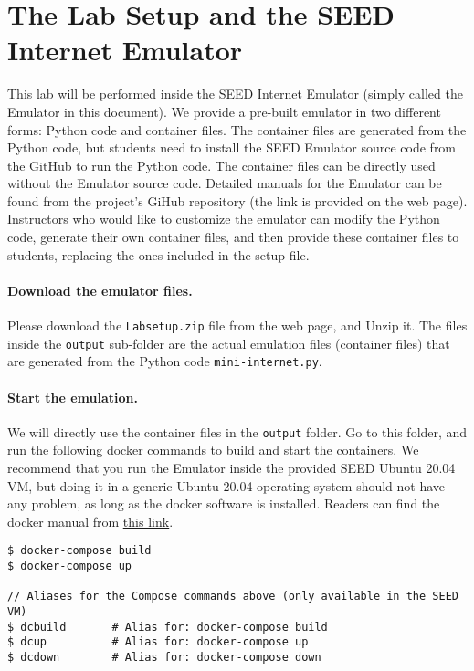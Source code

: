\section{The Lab Setup and the SEED Internet Emulator} 

This lab will be performed inside the SEED Internet Emulator (simply
called the Emulator in this document). 
We provide a pre-built emulator in two different forms: Python code
and container files. The container files are generated from
the Python code, but students need to install the SEED Emulator source 
code from the GitHub to run the Python code. The container files
can be directly used without the Emulator source code. 
Detailed manuals for the Emulator can be found from 
the project's GiHub repository (the link is provided on the web page).
Instructors who would like to customize the emulator can modify the Python
code, generate their own container files, and then provide these
container files to students, replacing the ones included in the 
setup file.


\paragraph{Download the emulator files.}
Please download the \texttt{Labsetup.zip} file from the web page, and 
Unzip it. The files inside the \texttt{output} sub-folder are the actual
emulation files (container files) that are
generated from the Python code \texttt{mini-internet.py}.


\paragraph{Start the emulation.}
We will directly use the container files in the \texttt{output} folder. 
Go to this folder, and run the following docker commands
to build and start the containers. We recommend that you run the Emulator inside
the provided SEED Ubuntu 20.04 VM, but doing it in a generic Ubuntu 20.04 operating system
should not have any problem, as long as the docker software is installed. 
Readers can find the docker manual from 
\href{https://github.com/seed-labs/seed-labs/blob/master/manuals/docker/SEEDManual-Container.md}
{\underline{this link}}.

\begin{lstlisting}
$ docker-compose build
$ docker-compose up

// Aliases for the Compose commands above (only available in the SEED VM)
$ dcbuild       # Alias for: docker-compose build
$ dcup          # Alias for: docker-compose up
$ dcdown        # Alias for: docker-compose down
\end{lstlisting}


